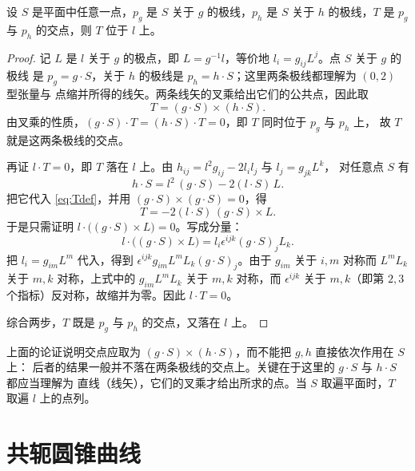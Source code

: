 \begin{proposition}
\label{prop:T-on-l}
设 $S$ 是平面中任意一点，$p_g$ 是 $S$ 关于 $g$ 的极线，$p_h$ 是 $S$ 关于 $h$ 的极线，$T$ 是
$p_g$ 与 $p_h$ 的交点，则 $T$ 位于 $l$ 上。
\end{proposition}

\begin{proof}
记 $L$ 是 $l$ 关于 $g$ 的极点，即 $L=g^{-1}l$，等价地 $l_i=g_{ij}L^j$。点 $S$ 关于 $g$ 的极线
是 $p_g=g\cdot S$，关于 $h$ 的极线是 $p_h=h\cdot S$；这里两条极线都理解为 $(0,2)$ 型张量与
点缩并所得的线矢。两条线矢的叉乘给出它们的公共点，因此取
\begin{equation}
\label{eq:Tdef}
T=(g\cdot S)\times(h\cdot S).
\end{equation}
由叉乘的性质，$(g\cdot S)\cdot T=(h\cdot S)\cdot T=0$，即 $T$ 同时位于 $p_g$ 与 $p_h$ 上，
故 $T$ 就是这两条极线的交点。

再证 $l\cdot T=0$，即 $T$ 落在 $l$ 上。由 $h_{ij}=l^2g_{ij}-2l_il_j$ 与 $l_j=g_{jk}L^k$，
对任意点 $S$ 有
\begin{equation}
\label{eq:hS}
h\cdot S=l^2\,(g\cdot S)-2(l\cdot S)\,L .
\end{equation}
把它代入 \eqref{eq:Tdef}，并用 $(g\cdot S)\times(g\cdot S)=0$，得
\begin{equation}
\label{eq:Tform}
T=-2(l\cdot S)\,(g\cdot S)\times L .
\end{equation}
于是只需证明 $l\cdot\bigl((g\cdot S)\times L\bigr)=0$。写成分量：
\[
l\cdot\bigl((g\cdot S)\times L\bigr)
=l_i\epsilon^{ijk}(g\cdot S)_jL_k .
\]
把 $l_i=g_{im}L^m$ 代入，得到 $\epsilon^{ijk}g_{im}L^mL_k(g\cdot S)_j$。由于 $g_{im}$ 关于
$i,m$ 对称而 $L^mL_k$ 关于 $m,k$ 对称，上式中的 $g_{im}L^mL_k$ 关于 $m,k$ 对称，而
$\epsilon^{ijk}$ 关于 $m,k$（即第 $2,3$ 个指标）反对称，故缩并为零。因此 $l\cdot T=0$。

综合两步，$T$ 既是 $p_g$ 与 $p_h$ 的交点，又落在 $l$ 上。
\end{proof}

\begin{remark}
上面的论证说明交点应取为 $(g\cdot S)\times(h\cdot S)$，而不能把 $g,h$ 直接依次作用在 $S$ 上：
后者的结果一般并不落在两条极线的交点上。关键在于这里的 $g\cdot S$ 与 $h\cdot S$ 都应当理解为
直线（线矢），它们的叉乘才给出所求的点。当 $S$ 取遍平面时，$T$ 取遍 $l$ 上的点列。
\end{remark}

\section{共轭圆锥曲线}


